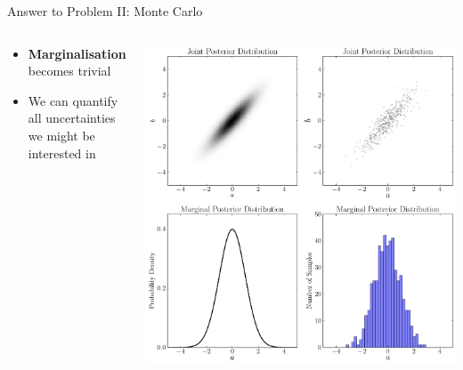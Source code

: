 \begin{frame}[t]{Answer to Problem II: Monte Carlo}
\begin{columns}[T]
\begin{column}{0.35\textwidth}
  \vspace{20pt}
  \begin{itemize}
  \setlength{\itemsep}{10pt}
  \item {\bf Marginalisation} becomes trivial
  \item We can quantify all uncertainties we might be interested in
  \end{itemize}
\end{column}
\hfill
\begin{column}{0.5\textwidth}
  \hspace{-30pt}
  \includegraphics[scale=0.22]{marginalisation.pdf}
\end{column}

\end{columns}
\end{frame}



